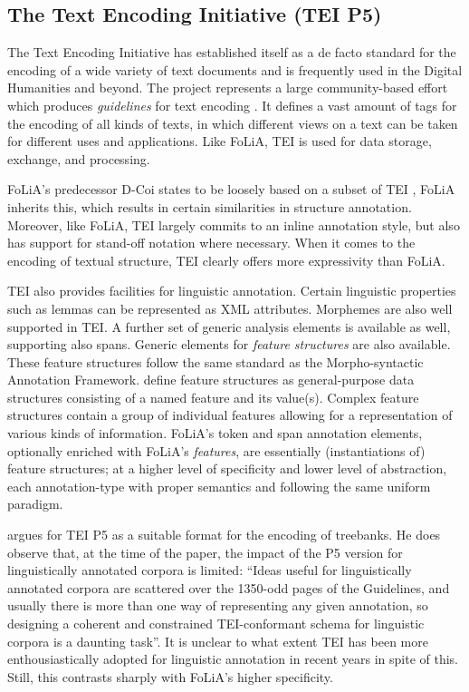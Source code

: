 \documentclass[a4paper,10pt,twoside]{article}
\begin{document}
\subsection{The Text Encoding Initiative (TEI P5)}

The Text Encoding Initiative has established itself as a de facto standard for
the encoding of a wide variety of text documents and is frequently used in the
Digital Humanities and beyond. The project represents a large community-based
effort which produces \emph{guidelines} for text encoding \cite{TEI}. It
defines a vast amount of tags for the encoding of all kinds of texts, in which
different views on a text can be taken for different uses and applications.
Like FoLiA, TEI is used for data storage, exchange, and processing.

FoLiA's predecessor D-Coi states to be loosely based on a subset of TEI
\cite{DCOI}, FoLiA inherits this, which results in certain similarities in
structure annotation. Moreover, like FoLiA, TEI largely commits to an inline
annotation style, but also has support for stand-off notation where necessary.
When it comes to the encoding of textual structure, TEI clearly offers more
expressivity than FoLiA. 

TEI also provides facilities for linguistic annotation. Certain
linguistic properties such as lemmas can be represented as XML attributes.
Morphemes are also well supported in TEI. A further set of generic analysis
elements is available as well, supporting also spans. Generic elements for
\emph{feature structures} are also available. These feature structures follow
the same standard as the Morpho-syntactic Annotation Framework.  define
feature structures as general-purpose data structures consisting of a named
feature and its value(s). Complex feature structures contain a group of
individual features allowing for a representation of various kinds of
information. FoLiA's token and span annotation elements, optionally enriched
with FoLiA's \emph{features}, are essentially (instantiations of) feature structures;
at a higher level of specificity and lower level of abstraction, each
annotation-type with proper semantics and following the same uniform paradigm.

 argues for TEI P5 as a suitable format for the encoding of
treebanks. He does observe that, at the time of the paper, the impact of the P5
version for linguistically annotated corpora is limited: ``Ideas useful for
linguistically annotated corpora are scattered over the 1350-odd pages of the
Guidelines, and usually there is more than one way of representing any given
annotation, so designing a coherent and constrained TEI-conformant schema for
linguistic corpora is a daunting task''.  It is unclear to what extent TEI has
been more enthousiastically adopted for linguistic annotation in recent years
in spite of this. Still, this contrasts sharply with FoLiA's higher
specificity.
\end{document}
